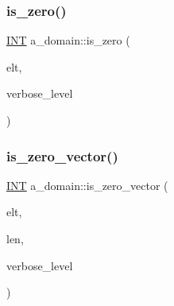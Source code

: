 \mbox{\label{classa__domain_a7931dba1ff177d54e06217dc8191f58c}} 
\subsubsection{\texorpdfstring{is\+\_\+zero()}{is\_zero()}}
{\footnotesize\ttfamily \mbox{\hyperlink{galois_8h_a09fddde158a3a20bd2dcadb609de11dc}{I\+NT}} a\+\_\+domain\+::is\+\_\+zero (\begin{DoxyParamCaption}\item[{\mbox{\hyperlink{galois_8h_a09fddde158a3a20bd2dcadb609de11dc}{I\+NT}} $\ast$}]{elt,  }\item[{\mbox{\hyperlink{galois_8h_a09fddde158a3a20bd2dcadb609de11dc}{I\+NT}}}]{verbose\+\_\+level }\end{DoxyParamCaption})}

\mbox{\label{classa__domain_ae912852fba4368a5dc10b3cf21d1ce71}} 
\subsubsection{\texorpdfstring{is\+\_\+zero\+\_\+vector()}{is\_zero\_vector()}}
{\footnotesize\ttfamily \mbox{\hyperlink{galois_8h_a09fddde158a3a20bd2dcadb609de11dc}{I\+NT}} a\+\_\+domain\+::is\+\_\+zero\+\_\+vector (\begin{DoxyParamCaption}\item[{\mbox{\hyperlink{galois_8h_a09fddde158a3a20bd2dcadb609de11dc}{I\+NT}} $\ast$}]{elt,  }\item[{\mbox{\hyperlink{galois_8h_a09fddde158a3a20bd2dcadb609de11dc}{I\+NT}}}]{len,  }\item[{\mbox{\hyperlink{galois_8h_a09fddde158a3a20bd2dcadb609de11dc}{I\+NT}}}]{verbose\+\_\+level }\end{DoxyParamCaption})}

\mbox{\label{classa__domain_a41b0e21e707fcfd0e9106f1e211d1cdf}} 
